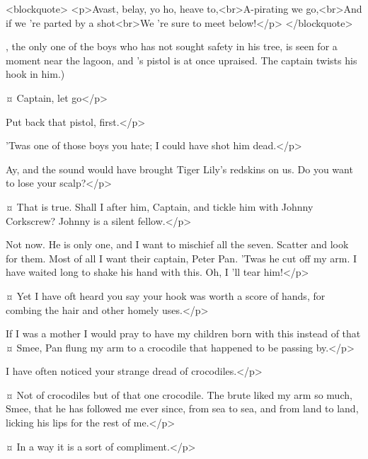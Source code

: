 <blockquote> <p>Avast, belay, yo ho, heave to,<br>A-pirating we go,<br>And if we 're parted by a shot<br>We 're sure to meet below!</p> </blockquote>

\begin{stagedir}
\nibs, the only one of the boys who has not sought safety in his tree, is seen for a moment near the lagoon,
and \starkey's pistol is at once upraised.
The captain twists his hook in him.)
\end{stagedir}

\starkeyspeaks {}¤
Captain, let go</p>

\hookspeaks
Put back that pistol, first.</p>

\starkeyspeaks
'Twas one of those boys you hate; I could have shot him dead.</p>

\hookspeaks
Ay, and the sound would have brought Tiger Lily's redskins on us.
Do you want to lose your scalp?</p>

\smeespeaks {}¤
That is true.
Shall I after him, Captain, and tickle him with Johnny Corkscrew?
Johnny is a silent fellow.</p>

\hookspeaks
Not now.
He is only one, and I want to mischief all the seven.
Scatter and look for them.
Most of all I want their captain, Peter Pan.
'Twas he cut off my arm.
I have waited long to shake his hand with this.
Oh, I 'll tear him!</p>

\smeespeaks {}¤
Yet I have oft heard you say your hook was worth a score of hands, for combing the hair and other homely uses.</p>

\hookspeaks
If I was a mother I would pray to have my children born with this instead of that
¤
Smee, Pan flung my arm to a crocodile that happened to be passing by.</p>

\smeespeaks
I have often noticed your strange dread of crocodiles.</p>

\hookspeaks {}¤
Not of crocodiles but of that one crocodile.
The brute liked my arm so much, Smee, that he has followed me ever since, from sea to sea, and from land to land, licking his lips for the rest of me.</p>

\smeespeaks {}¤
In a way it is a sort of compliment.</p>

